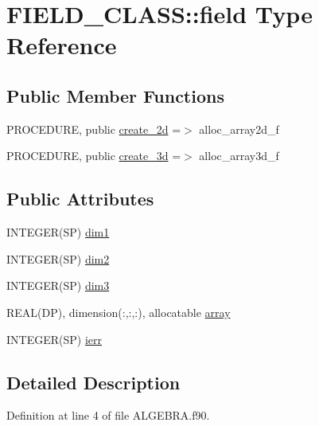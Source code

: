 \hypertarget{typeFIELD__CLASS_1_1field}{
\section{FIELD\_\-CLASS::field Type Reference}
\label{typeFIELD__CLASS_1_1field}
}
\subsection*{Public Member Functions}
\begin{DoxyCompactItemize}
\item 
PROCEDURE, public \hyperlink{typeFIELD__CLASS_1_1field_a8e023a1758937c8f025b8b39bb0a2610}{create\_\-2d} =$>$ alloc\_\-array2d\_\-f
\item 
PROCEDURE, public \hyperlink{typeFIELD__CLASS_1_1field_adf2bc2dbcc092c8ba80c752fc708746b}{create\_\-3d} =$>$ alloc\_\-array3d\_\-f
\end{DoxyCompactItemize}
\subsection*{Public Attributes}
\begin{DoxyCompactItemize}
\item 
INTEGER(SP) \hyperlink{typeFIELD__CLASS_1_1field_a370710dc9047b03120f6c7a17403805d}{dim1}
\item 
INTEGER(SP) \hyperlink{typeFIELD__CLASS_1_1field_a44feaba31e860b83d47d9a3daee820e4}{dim2}
\item 
INTEGER(SP) \hyperlink{typeFIELD__CLASS_1_1field_a53ff81eafe27728c0e0e3ace291e767f}{dim3}
\item 
REAL(DP), dimension(:,:,:), allocatable \hyperlink{typeFIELD__CLASS_1_1field_aff70dcbe5b209245d1ea9cb44c55a8b1}{array}
\item 
INTEGER(SP) \hyperlink{typeFIELD__CLASS_1_1field_abcd9a96e4cd329576b3dca7ff0ccfa0a}{ierr}
\end{DoxyCompactItemize}


\subsection{Detailed Description}


Definition at line 4 of file ALGEBRA.f90.



